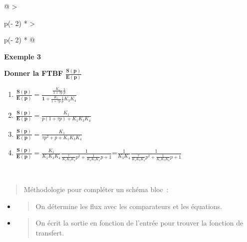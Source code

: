 \begin{longtable}[]{@{}
  >{\raggedright\arraybackslash}p{(\columnwidth - 2\tabcolsep) * }
  >{\raggedright\arraybackslash}p{(\columnwidth - 2\tabcolsep) * }@{}}
\begin{minipage}[b]{\linewidth}
\textbf{Exemple 3}

\textbf{Donner la FTBF} \(\frac{\mathbf{S(p)}}{\mathbf{E(p)}}\)

\begin{enumerate}
\def\labelenumi{\arabic{enumi}.}
\item
  \(\frac{\mathbf{S}\left( \mathbf{p} \right)}{\mathbf{E}\left( \mathbf{p} \right)} = \frac{\frac{K_{1}}{1 + \tau p}\frac{1}{p}}{\mathbf{1} + \frac{K_{1}}{1 + \tau p}\frac{1}{p}K_{3}K_{4}}\)
\item
  \(\frac{\mathbf{S}\left( \mathbf{p} \right)}{\mathbf{E}\left( \mathbf{p} \right)} = \frac{K_{1}}{p(1 + \tau p) + K_{1}K_{3}K_{4}}\)
\item
  \(\frac{\mathbf{S}\left( \mathbf{p} \right)}{\mathbf{E}\left( \mathbf{p} \right)} = \frac{K_{1}}{\tau p^{2} + p + K_{1}K_{3}K_{4}}\)
\item
  \(\frac{\mathbf{S}\left( \mathbf{p} \right)}{\mathbf{E}\left( \mathbf{p} \right)} = \frac{K_{1}}{K_{1}K_{3}K_{4}}\frac{1}{\frac{\tau}{K_{1}K_{3}K_{4}}p^{2} + \frac{1}{K_{1}K_{3}K_{4}}p + 1}\)=\(\frac{1}{K_{3}K_{4}}\frac{1}{\frac{\tau}{K_{1}K_{3}K_{4}}p^{2} + \frac{1}{K_{1}K_{3}K_{4}}p + 1}\)
\end{enumerate}
\end{minipage} \\
\midrule\noalign{}
\endhead
\bottomrule\noalign{}
\endlastfoot
\end{longtable}

\begin{quote}
Méthodologie pour compléter un schéma bloc~:
\end{quote}

\begin{itemize}
\item
  \begin{quote}
  On détermine les flux avec les comparateurs et les équations.
  \end{quote}
\item
  \begin{quote}
  On écrit la sortie en fonction de l'entrée pour trouver la fonction de transfert.
  \end{quote}
\end{itemize}

